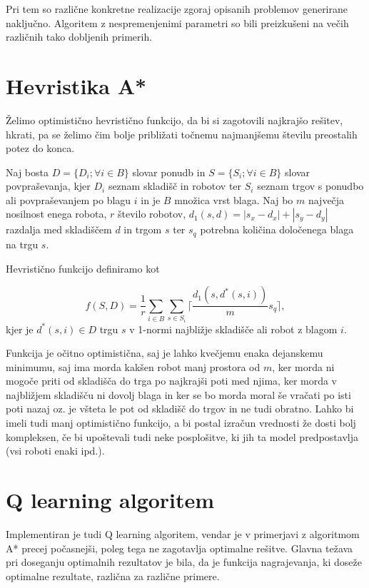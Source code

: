 \documentclass[a4paper,12pt]{article} %
\begin{document}
Pri tem so različne konkretne realizacije zgoraj opisanih problemov generirane naključno. Algoritem z nespremenjenimi parametri so bili preizkušeni na večih različnih tako dobljenih primerih.

\section{Hevristika A*}

Želimo optimistično hevristično funkcijo, da bi si zagotovili najkrajšo rešitev, hkrati, pa se želimo čim bolje približati točnemu najmanjšemu številu preostalih potez do konca.

Naj bosta $D = \lbrace D_i; \forall i\in B\rbrace$ slovar ponudb in $S = \lbrace S_i; \forall i\in B\rbrace$ slovar povpraševanja,
kjer $D_i$ seznam skladišč in robotov ter $S_i$ seznam trgov s  ponudbo ali povpraševanjem po blagu $i$ in je $B$ množica vrst blaga. Naj bo $m$ največja nosilnost enega robota, $r$ število robotov, $d_1(s,d) = |s_x-d_x|+|s_y-d_y|$ razdalja med skladiščem $d$ in trgom $s$ ter $s_q$ potrebna količina določenega blaga na trgu $s$.

Hevristično funkcijo definiramo kot

$$f(S,D) = \frac{1}{r}\sum_{i\in B}\sum_{s\in S_i}\lceil \frac{d_1(s,d^\ast(s,i))}{m} s_q\rceil,$$
kjer je $d^\ast(s,i)\in D$ trgu $s$ v 1-normi najbližje skladišče ali robot z blagom $i$.

Funkcija je očitno optimistična, saj je lahko kvečjemu enaka dejanskemu minimumu, saj ima morda kakšen robot manj prostora od $m$, ker morda ni mogoče priti od skladišča do trga po najkrajši poti med njima, ker morda v najbližjem skladišču ni dovolj blaga in ker se bo morda moral še vračati po isti poti nazaj oz. je všteta le pot od skladišč do trgov in ne tudi obratno. Lahko bi imeli tudi manj optimistično funkcijo, a bi postal izračun vrednosti že dosti bolj kompleksen, če bi upoštevali tudi neke posplošitve, ki jih ta model predpostavlja (vsi roboti enaki ipd.).

\section{Q learning algoritem}

Implementiran je tudi Q learning algoritem, vendar je v primerjavi z algoritmom A* precej počasnejši, poleg tega ne zagotavlja optimalne rešitve. Glavna težava pri doseganju optimalnih rezultatov je bila, da je funkcija nagrajevanja, ki doseže optimalne rezultate, različna za različne primere.
\end{document}

